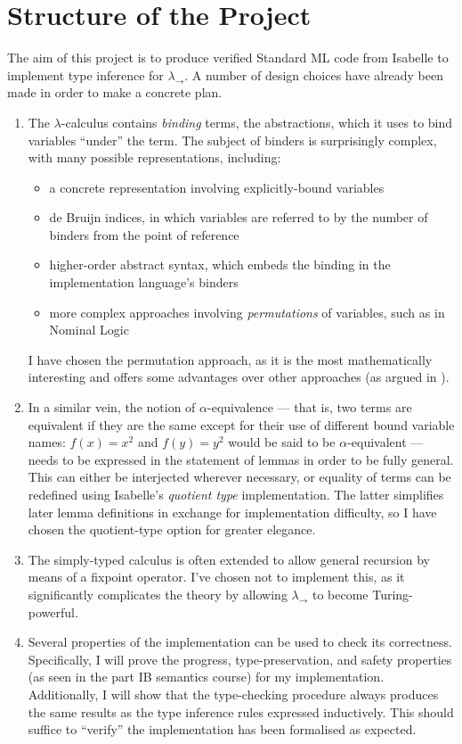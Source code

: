 \documentclass[12pt]{article}
\begin{document}
\section*{Structure of the Project}
The aim of this project is to produce verified Standard ML code from Isabelle to implement type inference for \(\lambda_\to\).
A number of design choices have already been made in order to make a concrete plan.
\begin{enumerate}
\item
The \(\lambda\)-calculus contains \emph{binding} terms, the abstractions, which it uses to bind variables ``under'' the term.
The subject of binders is surprisingly complex, with many possible representations, including:
\begin{itemize}
\item
a concrete representation involving explicitly-bound variables
\item
de Bruijn indices, in which variables are referred to by the number of binders from the point of reference
\item
higher-order abstract syntax, which embeds the binding in the implementation language's binders
\item
more complex approaches involving \emph{permutations} of variables, such as in Nominal Logic\parencite{binding}
\end{itemize}
I have chosen the permutation approach, as it is the most mathematically interesting and offers some advantages over other approaches (as argued in \parencite{binding}).
\item
In a similar vein, the notion of \(\alpha\)-equivalence --- that is, two terms are equivalent if they are the same except for their use of different bound variable names: \(f(x) = x^2\) and \(f(y) = y^2\) would be said to be \(\alpha\)-equivalent --- needs to be expressed in the statement of lemmas in order to be fully general.
This can either be interjected wherever necessary, or equality of terms can be redefined using Isabelle's \emph{quotient type} implementation.
The latter simplifies later lemma definitions in exchange for implementation difficulty, so I have chosen the quotient-type option for greater elegance.
\item
The simply-typed calculus is often extended to allow general recursion by means of a fixpoint operator.
I've chosen not to implement this, as it significantly complicates the theory by allowing \(\lambda_\to\) to become Turing-powerful.
\item
Several properties of the implementation can be used to check its correctness.
Specifically, I will prove the progress, type-preservation, and safety properties (as seen in the part IB semantics course) for my implementation.
Additionally, I will show that the type-checking procedure always produces the same results as the type inference rules expressed inductively.
This should suffice to ``verify'' the implementation has been formalised as expected.
\end{enumerate}
\end{document}
